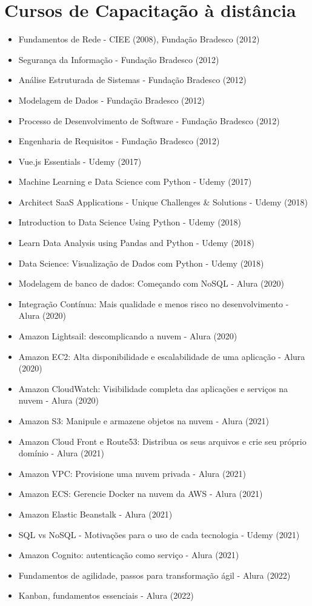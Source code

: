 \section{Cursos de Capacitação à distância}
\begin{itemize}
    \item Fundamentos de Rede - CIEE (2008), Fundação Bradesco (2012)
    \item Segurança da Informação - Fundação Bradesco (2012)
    \item Análise Estruturada de Sistemas - Fundação Bradesco (2012)
    \item Modelagem de Dados - Fundação Bradesco (2012)
    \item Processo de Desenvolvimento de Software - Fundação Bradesco (2012)
    \item Engenharia de Requisitos - Fundação Bradesco (2012)
    \item Vue.js Essentials - Udemy (2017)
    \item Machine Learning e Data Science com Python - Udemy (2017)
    \item Architect SaaS Applications - Unique Challenges & Solutions - Udemy (2018)
    \item Introduction to Data Science Using Python - Udemy (2018)
    \item Learn Data Analysis using Pandas and Python - Udemy (2018)
    \item Data Science: Visualização de Dados com Python - Udemy (2018)
    \item Modelagem de banco de dados: Começando com NoSQL - Alura (2020)
    \item Integração Contínua: Mais qualidade e menos risco no desenvolvimento - Alura (2020)
    \item Amazon Lightsail: descomplicando a nuvem - Alura (2020)
    \item Amazon EC2: Alta disponibilidade e escalabilidade de uma aplicação - Alura (2020)
    \item Amazon CloudWatch: Visibilidade completa das aplicações e serviços na nuvem - Alura (2020)
    \item Amazon S3: Manipule e armazene objetos na nuvem - Alura (2021)
    \item Amazon Cloud Front e Route53: Distribua os seus arquivos e crie seu próprio domínio - Alura (2021)
    \item Amazon VPC: Provisione uma nuvem privada - Alura (2021)
    \item Amazon ECS: Gerencie Docker na nuvem da AWS - Alura (2021)
    \item Amazon Elastic Beanstalk - Alura (2021)
    \item SQL vs NoSQL - Motivações para o uso de cada tecnologia - Udemy (2021)
    \item Amazon Cognito: autenticação como serviço - Alura (2021)
    \item Fundamentos de agilidade, passos para transformação ágil - Alura (2022)
    \item Kanban, fundamentos essenciais - Alura (2022)
\end{itemize}

